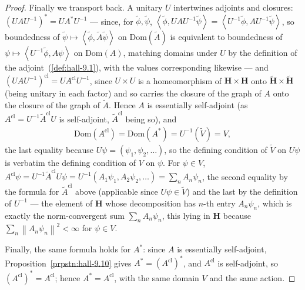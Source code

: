 \begin{proof}
Finally we transport back. A unitary $U$ intertwines adjoints and closures: $(UAU^{-1})^* = U A^* U^{-1}$ — since, for $\widetilde\phi,\widetilde\psi$, $\left< \widetilde\phi, UAU^{-1}\widetilde\psi \right> = \left< U^{-1}\widetilde\phi, A U^{-1}\widetilde\psi \right>$, so boundedness of $\widetilde\psi \mapsto \left< \widetilde\phi, \widetilde{A}\widetilde\psi \right>$ on $\text{Dom}(\widetilde A)$ is equivalent to boundedness of $\psi \mapsto \left< U^{-1}\widetilde\phi, A\psi \right>$ on $\text{Dom}(A)$, matching domains under $U$ by the definition of the adjoint~(\ref{def:hall-9.1}), with the values corresponding likewise — and $(UAU^{-1})^{\text{cl}} = U A^{\text{cl}} U^{-1}$, since $U \times U$ is a homeomorphism of $\mathbf{H}\times\mathbf{H}$ onto $\widetilde{\mathbf{H}}\times\widetilde{\mathbf{H}}$ (being unitary in each factor) and so carries the closure of the graph of $A$ onto the closure of the graph of $\widetilde{A}$. Hence $A$ is essentially self-adjoint (as $A^{\text{cl}} = U^{-1}\widetilde{A}^{\text{cl}}U$ is self-adjoint, $\widetilde{A}^{\text{cl}}$ being so), and
\begin{align}
    \text{Dom}(A^{\text{cl}}) = \text{Dom}(A^*) = U^{-1}(\widetilde{V}) = V,
\end{align}
the last equality because $U\psi = (\psi_1,\psi_2,\ldots)$, so the defining condition of $\widetilde{V}$ on $U\psi$ is verbatim the defining condition of $V$ on $\psi$. For $\psi \in V$, $A^{\text{cl}}\psi = U^{-1}\widetilde{A}^{\text{cl}}U\psi = U^{-1}(A_1\psi_1,A_2\psi_2,\ldots) = \sum_n A_n\psi_n$, the second equality by the formula for $\widetilde{A}^{\text{cl}}$ above (applicable since $U\psi \in \widetilde{V}$) and the last by the definition of $U^{-1}$ — the element of $\mathbf{H}$ whose decomposition has $n$-th entry $A_n\psi_n$, which is exactly the norm-convergent sum $\sum_n A_n\psi_n$, this lying in $\mathbf{H}$ because $\sum_n \left\| A_n\psi_n \right\|^2 < \infty$ for $\psi \in V$.

Finally, the same formula holds for $A^*$: since $A$ is essentially self-adjoint, Proposition~\ref{prpstn:hall-9.10} gives $A^* = (A^{\text{cl}})^*$, and $A^{\text{cl}}$ is self-adjoint, so $(A^{\text{cl}})^* = A^{\text{cl}}$; hence $A^* = A^{\text{cl}}$, with the same domain $V$ and the same action.
\end{proof}

